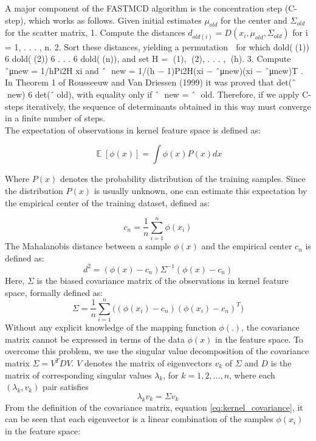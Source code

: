\documentclass[preprint,12pt]{elsarticle}
\begin{document}
A major component of the FASTMCD algorithm is the concentration step (C-step), which works
as follows. Given initial estimates $\mu_{old}$ for the center and $\Sigma_{old}$ for the scatter matrix,
1. Compute the distances $d_{old(i)} = D(x_i, \mu_{old}, \Sigma_{old})$ for i = 1, . . . , n.
2. Sort these distances, yielding a permutation  for which
dold((1)) 6 dold((2)) 6 . . . 6 dold((n)), and set H = {(1), (2), . . . , (h)}.
3. Compute ˆμnew = 1/hPi2H xi and ˆ new = 1/(h − 1)Pi2H(xi − ˆμnew)(xi − ˆμnew)T .
In Theorem 1 of Rousseeuw and Van Driessen (1999) it was proved that det(ˆ new) 6 det(ˆold),
with equality only if ˆ new = ˆ old. Therefore, if we apply C-steps iteratively, the sequence of
determinants obtained in this way must converge in a finite number of steps. \\


The expectation of observations in kernel feature space is defined as:

\begin{equation}
\mathop{\mathbb{E}}[\phi(x)] = \int \phi(x) P(x) dx
\end{equation}

Where $P(x)$ denotes the probability distribution of the training samples. Since the
distribution $P(x)$ is usually unknown, one can estimate this expectation by the empirical
center of the training dataset, defined as:

\begin{equation}
	c_n = \frac{1}{n} \sum_{i=1}^{n} \phi(x_i)
\end{equation}
The Mahalanobis distance between a sample $\phi(x)$ and the empirical
center $c_n$ is defined as:
\begin{equation}
	d^2 = (\phi(x) - c_n) \Sigma^{-1} (\phi(x) - c_n)
\end{equation}
Here, $\Sigma$ is the biased covariance matrix of the observations in kernel feature space, formally defined as:
\begin{equation}
	\Sigma = \frac{1}{n} \sum_{i=1}^{n}	\big( (\phi(x_i) - c_n) (\phi(x_i) - c_n)^T \big)
	\label{eq:kernel_covariance}
\end{equation}
Without any explicit knowledge of the mapping function $\phi(.)$, the covariance matrix
cannot be expressed in terms of the data $\phi(x)$ in the feature space. To overcome this problem, we use the singular value decomposition of the covariance matrix $\Sigma = V^T D V$. $V$ denotes the matrix of eigenvectors $v_k$ of $\Sigma$ and $D$ is the matrix of corresponding singular values $\lambda_k$, for $k = 1, 2, ..., n$, where each $(\lambda_k, v_k)$ pair satisfies   
\begin{equation}
	\lambda_k v_k = \Sigma v_k
\end{equation}
From the definition of the covariance matrix, equation \ref{eq:kernel_covariance}, it can be seen that each eigenvector is a linear
combination of the samples $\phi(x_i)$ in the feature space:
\end{document}
